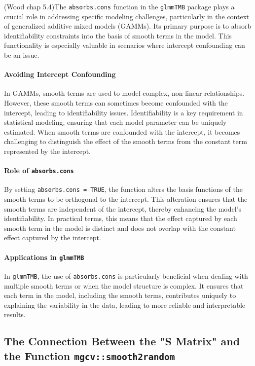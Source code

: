 \documentclass[12pt, twoside,hidelinks]{article}
\theoremstyle{definition}
\numberwithin{equation}{section}
\begin{document}
(Wood chap 5.4)The \texttt{absorbs.cons} function in the \texttt{glmmTMB} package plays a crucial role in addressing specific modeling challenges, particularly in the context of generalized additive mixed models (GAMMs). Its primary purpose is to absorb identifiability constraints into the basis of smooth terms in the model. This functionality is especially valuable in scenarios where intercept confounding can be an issue.

\paragraph{Avoiding Intercept Confounding}
In GAMMs, smooth terms are used to model complex, non-linear relationships. However, these smooth terms can sometimes become confounded with the intercept, leading to identifiability issues. Identifiability is a key requirement in statistical modeling, ensuring that each model parameter can be uniquely estimated. When smooth terms are confounded with the intercept, it becomes challenging to distinguish the effect of the smooth terms from the constant term represented by the intercept.

\paragraph{Role of \texttt{absorbs.cons}}
By setting \texttt{absorbs.cons = TRUE}, the function alters the basis functions of the smooth terms to be orthogonal to the intercept. This alteration ensures that the smooth terms are independent of the intercept, thereby enhancing the model's identifiability. In practical terms, this means that the effect captured by each smooth term in the model is distinct and does not overlap with the constant effect captured by the intercept.

\paragraph{Applications in \texttt{glmmTMB}}
In \texttt{glmmTMB}, the use of \texttt{absorbs.cons} is particularly beneficial when dealing with multiple smooth terms or when the model structure is complex. It ensures that each term in the model, including the smooth terms, contributes uniquely to explaining the variability in the data, leading to more reliable and interpretable results.


\subsection{The Connection Between the "S Matrix" and the Function \texttt{mgcv::smooth2random}}
\end{document}
